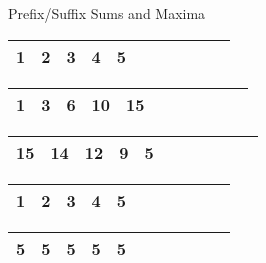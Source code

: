 \documentclass{beamer}
\begin{document}
\begin{frame}{Prefix/Suffix Sums and Maxima}
  \begin{table}[h]
    \begin{tabular}{|c|c|c|c|c|c|c|c|c|c|c|}
      \hline
      1 & 2 & 3 & 4 & 5 \\
      \hline
    \end{tabular}
  \end{table}

  \pause

  \begin{table}[h]
    \begin{tabular}{|c|c|c|c|c|c|c|c|c|c|c|}
      \hline
      1 & 3 & 6 & 10 & 15 \\
      \hline
    \end{tabular}
  \end{table}

  \pause

  \begin{table}[h]
    \begin{tabular}{|c|c|c|c|c|c|c|c|c|c|c|}
      \hline
      15 & 14 & 12 & 9 & 5 \\
      \hline
    \end{tabular}
  \end{table}

  \pause

  \begin{table}[h]
    \begin{tabular}{|c|c|c|c|c|c|c|c|c|c|c|}
      \hline
      1 & 2 & 3 & 4 & 5 \\
      \hline
    \end{tabular}
  \end{table}

  \pause

  \begin{table}[h]
    \begin{tabular}{|c|c|c|c|c|c|c|c|c|c|c|}
      \hline
      5 & 5 & 5 & 5 & 5 \\
      \hline
    \end{tabular}
  \end{table}
\end{frame}
\end{document}
